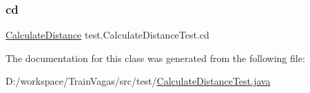 \subsubsection{\texorpdfstring{cd}{cd}}
{\footnotesize\ttfamily \hyperlink{classdomain_1_1_calculate_distance}{Calculate\+Distance} test.\+Calculate\+Distance\+Test.\+cd\hspace{0.3cm}{\ttfamily [package]}}



The documentation for this class was generated from the following file\+:\begin{DoxyCompactItemize}
\item 
D\+:/workspace/\+Train\+Vagas/src/test/\hyperlink{_calculate_distance_test_8java}{Calculate\+Distance\+Test.\+java}\end{DoxyCompactItemize}
